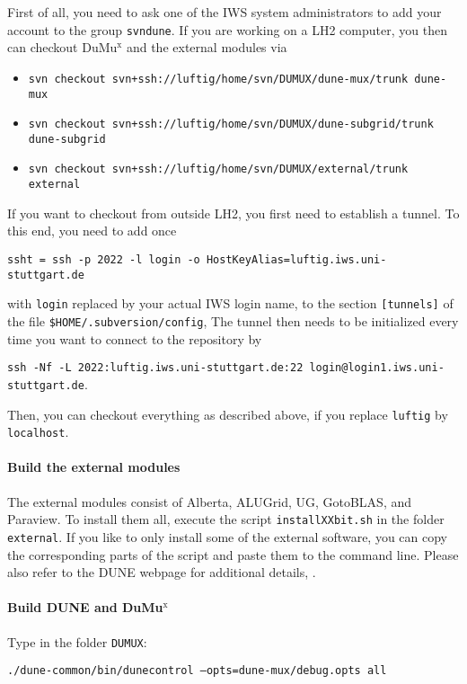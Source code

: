 First of all, you need to ask one of the IWS system administrators to 
add your account to the group \texttt{svndune}. 
If you are working on a LH2 computer, you then can checkout DuMu$^\text{x}$ 
and the external modules via 
\begin{itemize}
\item \texttt{svn checkout svn+ssh://luftig/home/svn/DUMUX/dune-mux/trunk dune-mux}
\item \texttt{svn checkout svn+ssh://luftig/home/svn/DUMUX/dune-subgrid/trunk dune-subgrid}
\item \texttt{svn checkout svn+ssh://luftig/home/svn/DUMUX/external/trunk external}
\end{itemize} 
If you want to checkout from outside LH2, you first need to establish a tunnel. 
To this end, you need to add once 
\begin{center}
\texttt{ssht = ssh -p 2022 -l login -o HostKeyAlias=luftig.iws.uni-stuttgart.de} 
\end{center}
with \texttt{login} replaced 
by your actual IWS login name, to the section \texttt{[tunnels]} of the 
file \texttt{\$HOME/.subversion/config}, 
The tunnel then needs to be initialized every time you want 
to connect to the repository by 
\begin{center}
\texttt{ssh -Nf -L 2022:luftig.iws.uni-stuttgart.de:22 login@login1.iws.uni-stuttgart.de}.
\end{center}
Then, you can checkout everything as described above, if you replace \texttt{luftig} 
by \texttt{localhost}. 

\paragraph{Build the external modules} 
The external modules consist of Alberta, ALUGrid, UG, GotoBLAS, and Paraview. 
To install them all, execute the script \texttt{installXXbit.sh} in the folder \texttt{external}. 
If you like to only install some of the external software, you can copy the corresponding 
parts of the script and paste them to the command line. 
Please also refer to the DUNE webpage for additional details, \cite{DUNE-HP}. 

\paragraph{Build DUNE and DuMu$^\text{x}$}
Type in the folder \texttt{DUMUX}: 
\begin{center}
\texttt{./dune-common/bin/dunecontrol --opts=dune-mux/debug.opts all}
\end{center}

